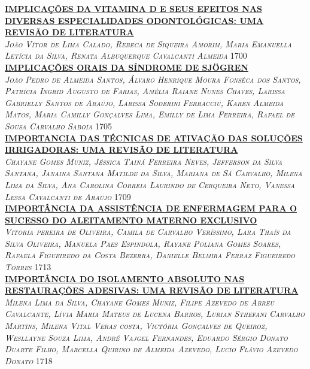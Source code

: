 \noindent \textsc{\hyperlink{trabalhos/250340.pdf.1}{\textbf{IMPLICAÇÕES DA VITAMINA D E SEUS EFEITOS NAS DIVERSAS ESPECIALIDADES ODONTOLÓGICAS: UMA REVISÃO DE LITERATURA}}}\\ 
\noindent \textsc{\textit{João Vítor de Lima Calado, Rebeca de Siqueira Amorim, Maria Emanuella Letícia da Silva, Renata Albuquerque Cavalcanti Almeida}} \hfill 1700\\ 

\noindent \textsc{\hyperlink{trabalhos/251269.pdf.1}{\textbf{IMPLICAÇÕES ORAIS DA SÍNDROME DE SJÖGREN}}}\\ 
\noindent \textsc{\textit{João Pedro de Almeida Santos, Álvaro Henrique Moura Fonsêca dos Santos, Patrícia Ingrid Augusto de Farias, Amélia Raiane Nunes Chaves, Larissa Gabrielly Santos de Araújo, Larissa Soderini Ferracciú, Karen Almeida Matos, Maria Camilly Gonçalves Lima, Emilly de Lima Ferreira, Rafael de Sousa Carvalho Saboia}} \hfill 1705\\ 

\noindent \textsc{\hyperlink{trabalhos/250011.pdf.1}{\textbf{IMPORTANCIA DAS TÉCNICAS DE ATIVAÇÃO DAS SOLUÇÕES IRRIGADORAS: UMA REVISÃO DE LITERATURA}}}\\ 
\noindent \textsc{\textit{Chayane Gomes Muniz, Jéssica Tainá Ferreira Neves, Jefferson da Silva Santana, Janaina Santana Matilde da Silva, Mariana de Sá Carvalho, Milena Lima da Silva, Ana Carolina Correia Laurindo de Cerqueira Neto, Vanessa Lessa Cavalcanti de Araújo}} \hfill 1709\\ 

\noindent \textsc{\hyperlink{trabalhos/251282.pdf.1}{\textbf{IMPORTÂNCIA DA ASSISTÊNCIA DE ENFERMAGEM PARA O SUCESSO DO ALEITAMENTO MATERNO EXCLUSIVO}}}\\ 
\noindent \textsc{\textit{Vitoria pereira de Oliveira, Camila de Carvalho Veríssimo, Lara Thaís da Silva Oliveira, Manuela Paes Espindola, Rayane Poliana Gomes Soares, Rafaela Figueiredo da Costa Bezerra, Danielle Belmira Ferraz Figueiredo Torres}} \hfill 1713\\ 

\noindent \textsc{\hyperlink{trabalhos/249759.pdf.1}{\textbf{IMPORTÂNCIA DO ISOLAMENTO ABSOLUTO NAS RESTAURAÇÕES ADESIVAS: UMA REVISÃO DE LITERATURA }}}\\ 
\noindent \textsc{\textit{Milena Lima da Silva, Chayane Gomes Muniz, Filipe Azevedo de Abreu Cavalcante, Lívia Maria Mateus de Lucena Barros, Lurian Sthefani Carvalho Martins, Milena Vital Veras costa, Victória Gonçalves de Queiroz, Wesllayne Souza Lima, André Vajgel Fernandes, Eduardo Sérgio Donato Duarte Filho, Marcella Quirino de Almeida Azevedo, Lucio Flávio Azevedo Donato}} \hfill 1718\\ 

